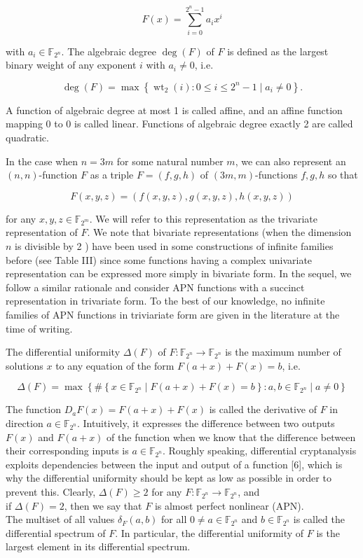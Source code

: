 \documentclass[10pt]{article}
\begin{document}
$$
F(x)=\sum_{i=0}^{2^{n}-1} a_{i} x^{i}
$$

with $a_{i} \in \mathbb{F}_{2^{n}}$. The algebraic degree $\operatorname{deg}(F)$ of $F$ is defined as the largest binary weight of any exponent $i$ with $a_{i} \neq 0$, i.e.

$$
\operatorname{deg}(F)=\max \left\{\operatorname{wt}_{2}(i): 0 \leq i \leq 2^{n}-1 \mid a_{i} \neq 0\right\} .
$$

A function of algebraic degree at most 1 is called affine, and an affine function mapping 0 to 0 is called linear. Functions of algebraic degree exactly 2 are called quadratic.

In the case when $n=3 m$ for some natural number $m$, we can also represent an $(n, n)$-function $F$ as a triple $F=(f, g, h)$ of $(3 m, m)$-functions $f, g, h$ so that

$$
F(x, y, z)=(f(x, y, z), g(x, y, z), h(x, y, z))
$$

for any $x, y, z \in \mathbb{F}_{2^{m}}$. We will refer to this representation as the trivariate representation of $F$. We note that bivariate representations (when the dimension $n$ is divisible by 2 ) have been used in some constructions of infinite families before (see Table III) since some functions having a complex univariate representation can be expressed more simply in bivariate form. In the sequel, we follow a similar rationale and consider APN functions with a succinct representation in trivariate form. To the best of our knowledge, no infinite families of APN functions in triviariate form are given in the literature at the time of writing.

The differential uniformity $\Delta(F)$ of $F: \mathbb{F}_{2^{n}} \rightarrow \mathbb{F}_{2^{n}}$ is the maximum number of solutions $x$ to any equation of the form $F(a+x)+F(x)=b$, i.e.

$$
\Delta(F)=\max \left\{\#\left\{x \in \mathbb{F}_{2^{n}} \mid F(a+x)+F(x)=b\right\}: a, b \in \mathbb{F}_{2^{n}} \mid a \neq 0\right\}
$$

The function $D_{a} F(x)=F(a+x)+F(x)$ is called the derivative of $F$ in direction $a \in \mathbb{F}_{2^{n}}$. Intuitively, it expresses the difference between two outputs $F(x)$ and $F(a+x)$ of the function when we know that the difference between their corresponding inputs is $a \in \mathbb{F}_{2^{n}}$. Roughly speaking, differential cryptanalysis exploits dependencies between the input and output of a function [6], which is why the differential uniformity should be kept as low as possible in order to prevent this. Clearly, $\Delta(F) \geq 2$ for any $F: \mathbb{F}_{2^{n}} \rightarrow \mathbb{F}_{2^{n}}$, and\\
if $\Delta(F)=2$, then we say that $F$ is almost perfect nonlinear (APN).\\
The multiset of all values $\delta_{F}(a, b)$ for all $0 \neq a \in \mathbb{F}_{2^{n}}$ and $b \in \mathbb{F}_{2^{n}}$ is called the differential spectrum of $F$. In particular, the differential uniformity of $F$ is the largest element in its differential spectrum.
\end{document}
